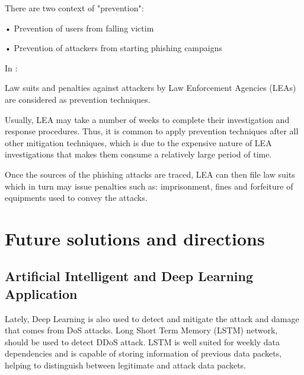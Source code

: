 \documentclass{ijitcs}
\begin{document}
There are two context of "prevention":

• Prevention of users from falling victim 

• Prevention of attackers from starting phishing campaigns

In \cite{khonji2013phishing}:

Law suits and penalties against attackers
by Law Enforcement Agencies (LEAs) are considered as
prevention techniques.

Usually, LEA may take a number of weeks to complete
their investigation and response procedures. Thus, it is common to apply prevention techniques after all other mitigation
techniques, which is due to the expensive nature of LEA
investigations that makes them consume a relatively large
period of time.

Once the sources of the phishing attacks are traced, LEA
can then file law suits which in turn may issue penalties such
as: imprisonment, fines and forfeiture of equipments used to
convey the attacks.









\section{Future solutions and directions}
\subsection{Artificial Intelligent and Deep Learning Application}
 Lately, Deep Learning is also used to detect and mitigate the attack and damage that comes from DoS attacks. Long Short Term Memory (LSTM) network, should be used to detect DDoS attack. LSTM is well suited for weekly data dependencies and is capable of storing information of previous data packets, helping to distinguish between legitimate and attack data packets.
\end{document}
